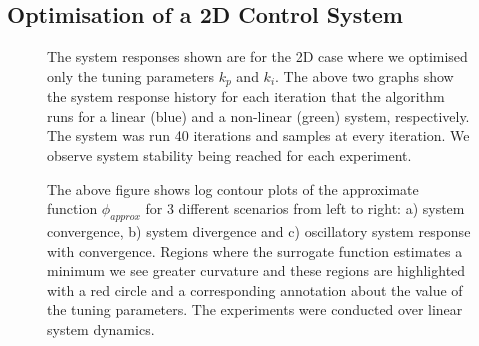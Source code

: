 \documentclass[conference]{IEEEtran}
\theoremstyle{definition}
\begin{document}
\subsection{Optimisation of a 2D Control System}
\begin{figure}[h]
    \setlength{\abovecaptionskip}{0pt}
    \caption{The system responses shown are for the 2D case where we optimised only the tuning parameters $k_p$ and $k_i$. The above two graphs show the system response history for each iteration that the algorithm runs for a linear (blue) and a non-linear (green) system, respectively. The system was run 40 iterations and samples at every  iteration. We observe system stability being reached for each experiment.}
    \label{kpki}
\end{figure}

\begin{figure}[h]
    \caption{The above figure shows log contour plots of the approximate function $\phi_{approx}$ for 3 different scenarios from left to right: a) system convergence, b) system divergence and c) oscillatory system response with convergence. Regions where the surrogate function estimates a minimum we see greater curvature and these regions are highlighted with a red circle and a corresponding annotation about the value of the tuning parameters. The experiments were conducted over linear system dynamics.}
    \label{kpki_contour}
\end{figure}
\end{document}
